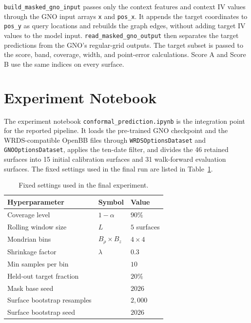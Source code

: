 \texttt{build\_masked\_gno\_input} passes only the context features and context IV values through the GNO input arrays \texttt{x} and \texttt{pos\_x}. It appends the target coordinates to \texttt{pos\_y} as query locations and rebuilds the graph edges, without adding target IV values to the model input. \texttt{read\_masked\_gno\_output} then separates the target predictions from the GNO's regular-grid outputs. The target subset is passed to the score, band, coverage, width, and point-error calculations. Score A and Score B use the same indices on every surface.

\section{Experiment Notebook}
\label{sec:impl_notebook}

The experiment notebook \texttt{conformal\_prediction.ipynb} is the integration point for the reported pipeline. It loads the pre-trained GNO checkpoint and the WRDS-compatible OpenBB files through \texttt{WRDSOptionsDataset} and \texttt{GNOOptionsDataset}, applies the ten-date filter, and divides the 46 retained surfaces into 15 initial calibration surfaces and 31 walk-forward evaluation surfaces. The fixed settings used in the final run are listed in Table~\ref{tab:hyperparams}.

\begin{table}[H]
\centering
\begin{tabular}{|l|l|l|}
\hline
\textbf{Hyperparameter} & \textbf{Symbol} & \textbf{Value} \\
\hline
Coverage level          & $1 - \alpha$    & $90\%$ \\
\hline
Rolling window size     & $L$             & $5$ surfaces \\
\hline
Mondrian bins           & $B_\rho \times B_z$ & $4 \times 4$ \\
\hline
Shrinkage factor        & $\lambda$       & $0.3$ \\
\hline
Min samples per bin     &                 & $10$ \\
\hline
Held-out target fraction &                & $20\%$ \\
\hline
Mask base seed          &                 & $2026$ \\
\hline
Surface bootstrap resamples &             & $2{,}000$ \\
\hline
Surface bootstrap seed &                  & $2026$ \\
\hline
\end{tabular}
\caption{Fixed settings used in the final experiment.}
\label{tab:hyperparams}
\end{table}

